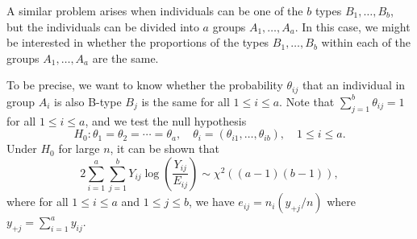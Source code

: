 \documentclass[10pt]{article}
\theoremstyle{newstyle}
\begin{document}
A similar problem arises when individuals can be one of the $b$ types $B_1, \dots, B_b$, but 
the individuals can be divided into $a$ groups $A_1, \dots, A_a$. 
In this case, we might be interested in whether the proportions of the types $B_1, \dots, B_b$ 
within each of the groups $A_1, \dots, A_a$ are the same. 

To be precise, we want to know whether the 
probability $\theta_{ij}$ that an individual in group $A_i$ is also B-type $B_j$ is the 
same for all $1 \leq i \leq a$. Note that $\sum_{j=1}^b \theta_{ij} = 1$ for all $1 \leq i \leq a$, 
and we test the null hypothesis 
\[ H_0 : \theta_1 = \theta_2 = \cdots = \theta_a, \quad \theta_i = (\theta_{i1}, \dots, \theta_{ib}), 
\quad 1 \leq i \leq a. \]
Under $H_0$ for large $n$, it can be shown that 
\[ 2 \sum_{i=1}^a \sum_{j=1}^b Y_{ij} \log \left( \frac{Y_{ij}}{E_{ij}} \right) \sim \chi^2((a-1)(b-1)), \] where for all $1 \leq i \leq a$ and $1 \leq j \leq b$, we have $e_{ij} = n_i(y_{+j}/n)$ where 
$y_{+j} = \sum_{i=1}^a y_{ij}$. 
\end{document}
